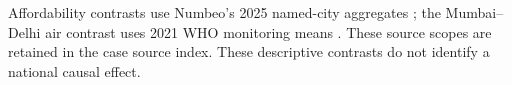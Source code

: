 

\CountryInterpretation
Affordability contrasts use Numbeo's 2025 named-city aggregates
\cite{numbeocase}; the Mumbai--Delhi air contrast uses 2021 WHO monitoring
means \cite{whocase}. These source scopes are retained in the case source index.
These descriptive contrasts do not identify a national causal effect.
